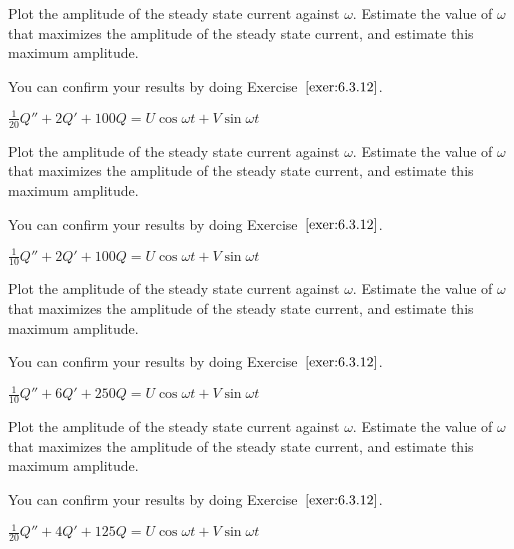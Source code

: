 \documentclass{ximera}
\begin{document}
\begin{problem}\label{exer:6.3.14} Plot the
amplitude of the steady state current against $\omega$. Estimate the
value of $\omega$ that maximizes the amplitude of the steady state
current, and estimate this maximum amplitude. 
\begin{hint}
    You can confirm
your results by doing Exercise~$\ref{exer:6.3.12}$.
\end{hint}
$\frac{1}{20}Q''+2Q'+100Q=U\cos\omega t+V\sin\omega t$
\end{problem}

\begin{problem}\label{exer:6.3.15} Plot the
amplitude of the steady state current against $\omega$. Estimate the
value of $\omega$ that maximizes the amplitude of the steady state
current, and estimate this maximum amplitude. 
\begin{hint}
    You can confirm
your results by doing Exercise~$\ref{exer:6.3.12}$.
\end{hint}
$\frac{1}{10}Q''+2Q'+100Q=U\cos\omega t+V\sin\omega t$
\end{problem}

\begin{problem}\label{exer:6.3.16} Plot the
amplitude of the steady state current against $\omega$. Estimate the
value of $\omega$ that maximizes the amplitude of the steady state
current, and estimate this maximum amplitude. 
\begin{hint}
    You can confirm
your results by doing Exercise~$\ref{exer:6.3.12}$.
\end{hint}
$\frac{1}{10}Q''+6Q'+250Q=U\cos\omega t+V\sin\omega t$
\end{problem}

\begin{problem}\label{exer:6.3.17}
Plot the
amplitude of the steady state current against $\omega$. Estimate the
value of $\omega$ that maximizes the amplitude of the steady state
current, and estimate this maximum amplitude. 
\begin{hint}
    You can confirm
your results by doing Exercise~$\ref{exer:6.3.12}$.
\end{hint}
$\frac{1}{20}Q''+4Q'+125Q=U\cos\omega t+V\sin\omega t$
\end{problem}
\end{document}
